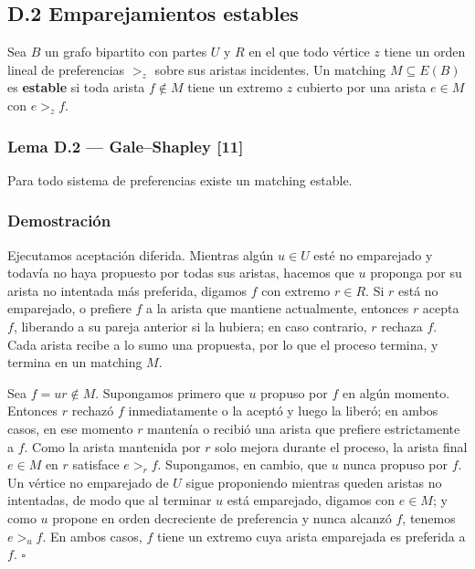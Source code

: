 \documentclass[
  11pt,
]{article}
\begin{document}
\subsection{D.2 Emparejamientos estables}\label{d.2-emparejamientos-estables}

Sea \(B\) un grafo bipartito con partes \(U\) y \(R\) en el que todo vértice \(z\) tiene un orden lineal de preferencias \(>_z\) sobre sus aristas incidentes. Un matching \(M\subseteq E(B)\) es \textbf{estable} si toda arista \(f\notin M\) tiene un extremo \(z\) cubierto por una arista \(e\in M\) con \(e>_zf\).

\subsubsection{Lema D.2 --- Gale--Shapley {[}11{]}}\label{lema-d.2-galeshapley-11}

Para todo sistema de preferencias existe un matching estable.

\subsubsection{Demostración}\label{demostraciuxf3n-8}

Ejecutamos aceptación diferida. Mientras algún \(u\in U\) esté no emparejado y todavía no haya propuesto por todas sus aristas, hacemos que \(u\) proponga por su arista no intentada más preferida, digamos \(f\) con extremo \(r\in R\). Si \(r\) está no emparejado, o prefiere \(f\) a la arista que mantiene actualmente, entonces \(r\) acepta \(f\), liberando a su pareja anterior si la hubiera; en caso contrario, \(r\) rechaza \(f\). Cada arista recibe a lo sumo una propuesta, por lo que el proceso termina, y termina en un matching \(M\).

Sea \(f=ur\notin M\). Supongamos primero que \(u\) propuso por \(f\) en algún momento. Entonces \(r\) rechazó \(f\) inmediatamente o la aceptó y luego la liberó; en ambos casos, en ese momento \(r\) mantenía o recibió una arista que prefiere estrictamente a \(f\). Como la arista mantenida por \(r\) solo mejora durante el proceso, la arista final \(e\in M\) en \(r\) satisface \(e>_rf\). Supongamos, en cambio, que \(u\) nunca propuso por \(f\). Un vértice no emparejado de \(U\) sigue proponiendo mientras queden aristas no intentadas, de modo que al terminar \(u\) está emparejado, digamos con \(e\in M\); y como \(u\) propone en orden decreciente de preferencia y nunca alcanzó \(f\), tenemos \(e>_uf\). En ambos casos, \(f\) tiene un extremo cuya arista emparejada es preferida a \(f\). \(\square\)
\end{document}
